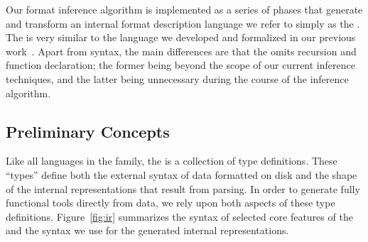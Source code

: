Our format inference algorithm is implemented as a series of phases that
generate and transform an internal format description language we
refer to simply as the \ir.  The \ir{} is very similar to
the \ipads{} language we developed and formalized in our previous 
work~\cite{fisher+:popl06}.  Apart from syntax, the main differences 
are that the \ir{} omits recursion and function declaration; the former
being beyond the scope of our current inference techniques, and the 
latter being unnecessary during the course of the inference algorithm.  

\subsection{Preliminary Concepts}

Like all languages in the \pads{} family, the \ir{} is a collection of
type definitions.  These ``types'' define both the external syntax of
data formatted on disk and the shape of the internal representations
that result from parsing.  In order to generate fully functional tools
directly from data, we rely upon both aspects of these type definitions.
Figure~\ref{fig:ir} summarizes the syntax of selected core features of 
the \ir{} and the syntax we use for the generated internal representations.

